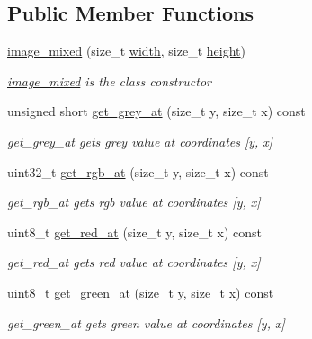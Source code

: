 \subsection*{Public Member Functions}
\begin{DoxyCompactItemize}
\item 
\hyperlink{classcloud__object__segmentation_1_1image__mixed_a1eb94b534be255a197dca62ecf6bdc07}{image\+\_\+mixed} (size\+\_\+t \hyperlink{classcloud__object__segmentation_1_1image_ac46913c2b63ca4d8e60f267a374429be}{width}, size\+\_\+t \hyperlink{classcloud__object__segmentation_1_1image_ad0e1ec069c7c5f8cde4cc1cd3f86ad1c}{height})
\begin{DoxyCompactList}\small\item\em \hyperlink{classcloud__object__segmentation_1_1image__mixed}{image\+\_\+mixed} is the class constructor \end{DoxyCompactList}\item 
unsigned short \hyperlink{classcloud__object__segmentation_1_1image__mixed_ae688fafdb339112c3efaf84ab0a71d75}{get\+\_\+grey\+\_\+at} (size\+\_\+t y, size\+\_\+t x) const 
\begin{DoxyCompactList}\small\item\em get\+\_\+grey\+\_\+at gets grey value at coordinates \mbox{[}y, x\mbox{]} \end{DoxyCompactList}\item 
uint32\+\_\+t \hyperlink{classcloud__object__segmentation_1_1image__mixed_aed06aea309473b9813d926a1d0dc5db1}{get\+\_\+rgb\+\_\+at} (size\+\_\+t y, size\+\_\+t x) const 
\begin{DoxyCompactList}\small\item\em get\+\_\+rgb\+\_\+at gets rgb value at coordinates \mbox{[}y, x\mbox{]} \end{DoxyCompactList}\item 
uint8\+\_\+t \hyperlink{classcloud__object__segmentation_1_1image__mixed_a53117c76d2bbd9e873f3b25084272106}{get\+\_\+red\+\_\+at} (size\+\_\+t y, size\+\_\+t x) const 
\begin{DoxyCompactList}\small\item\em get\+\_\+red\+\_\+at gets red value at coordinates \mbox{[}y, x\mbox{]} \end{DoxyCompactList}\item 
uint8\+\_\+t \hyperlink{classcloud__object__segmentation_1_1image__mixed_aa7b92c493de7627960bc2db843abf170}{get\+\_\+green\+\_\+at} (size\+\_\+t y, size\+\_\+t x) const 
\begin{DoxyCompactList}\small\item\em get\+\_\+green\+\_\+at gets green value at coordinates \mbox{[}y, x\mbox{]} \end{DoxyCompactList}\item 

\end{DoxyCompactItemize}
